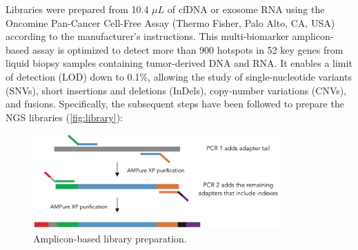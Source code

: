 Libraries were prepared from 10.4 $\mu L$ of cfDNA or exosome RNA using the Oncomine\texttrademark{} Pan-Cancer Cell-Free Assay (Thermo Fisher, Palo Alto, CA, USA) according to the manufacturer's instructions. This multi-biomarker amplicon-based assay is optimized to detect more than 900 hotspots in 52 key genes from liquid biopsy samples containing tumor-derived DNA and RNA. It enables a limit of detection (LOD) down to 0.1\%, allowing the study of single-nucleotide variants (SNVs), short insertions and deletions (InDels), copy-number variations (CNVs), and fusions. Specifically, the subsequent steps have been followed to prepare the NGS libraries (\autoref{fig:library}):

\begin{figure}[ht]
    \centering
    \includegraphics[width=0.85\textwidth]{Images/chapter_3/NGS_library.png}
    \caption{Amplicon-based library preparation.}
    \label{fig:library}
\end{figure}

